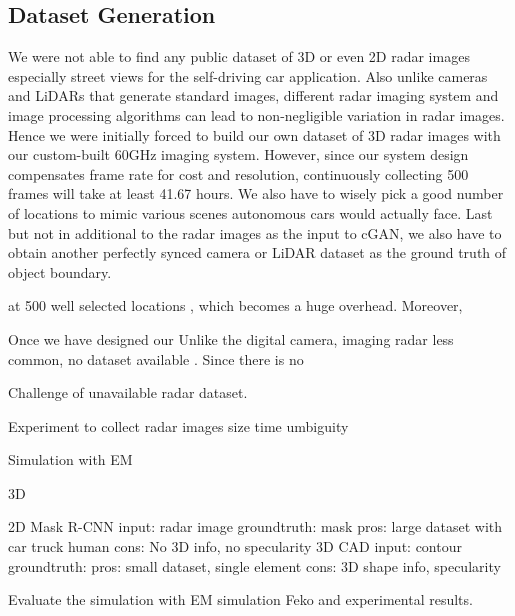 \subsection{Dataset Generation}
We were not able to find any public dataset of 3D or even 2D radar images especially street views for the self-driving car application. Also unlike cameras and LiDARs that generate standard images, different radar imaging system and image processing algorithms can lead to non-negligible variation in radar images. Hence we were initially forced to build our own dataset of 3D radar images with our custom-built 60GHz imaging system. However, since our system design compensates frame rate for cost and resolution, continuously collecting 500 frames will take at least 41.67 hours. We also have to wisely pick a good number of locations to mimic various scenes autonomous cars would actually face. Last but not in additional to the radar images as the input to cGAN, we also have to obtain another perfectly synced camera or LiDAR dataset as the ground truth of object boundary.  

 at 500 well selected locations , which becomes a huge overhead. Moreover, 

Once we have designed our Unlike the digital camera, imaging radar less common, no dataset available .
Since there is no

Challenge of unavailable radar dataset.

Experiment to collect radar images size time umbiguity

Simulation with EM 



3D %

2D
	Mask R-CNN
		input: radar image
		groundtruth: mask
	pros: large dataset with car truck human 
	cons: No 3D info, no specularity
	3D CAD
		input: contour
		groundtruth:
	pros: small dataset, single element 
	cons: 3D shape info, specularity 


Evaluate the simulation with EM simulation Feko and experimental results.

